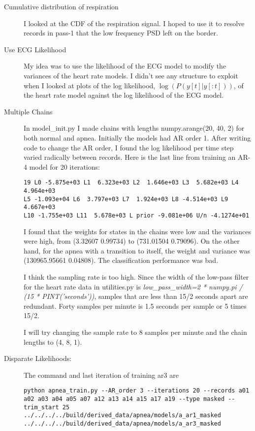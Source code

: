 \documentclass[12pt]{article}
\begin{document}
\begin{description}
\item[Cumulative distribution of respiration] I looked at the CDF of
  the respiration signal.  I hoped to use it to resolve records in
  pass-1 that the low frequency PSD left on the border.
\item[Use ECG Likelihood] My idea was to use the likelihood of the ECG
  model to modify the variances of the heart rate models.  I didn't
  see any structure to exploit when I looked at plots of the log
  likelihood, $\log\left(P(y[t]|y[:t]) \right)$, of the heart rate
  model against the log likelihood of the ECG model.
\item[Multiple Chains] In model\_init.py I made chains with lengths
  numpy.arange(20, 40, 2) for both normal and apnea.  Initially the
  models had AR order 1.  After writing code to change the AR order, I
  found the log likelihood per time step varied radically between
  records.  Here is the last line from training an AR-4 model for 20
  iterations:
\begin{verbatim}
19 L0 -5.875e+03 L1  6.323e+03 L2  1.646e+03 L3  5.682e+03 L4  4.964e+03
L5 -1.093e+04 L6  3.797e+03 L7  1.924e+03 L8 -4.514e+03 L9  4.667e+03
L10 -1.755e+03 L11  5.678e+03 L prior -9.081e+06 U/n -4.1274e+01
\end{verbatim}
  I found that the weights for states in the chains were low and the
  variances were high, from (3.32607 0.99734) to (731.01504 0.79096).
  On the other hand, for the apnea with a transition to itself, the
  weight and variance was (130965.95661 0.04808).  The classification
  performance was bad.

  I think the sampling rate is too high.  Since the width of the
  low-pass filter for the heart rate data in utilities.py is
  \emph{low\_pass\_width=2 * numpy.pi / (15 * PINT('seconds'))},
  samples that are less than 15/2 seconds apart are redundant.  Forty
  samples per minute is 1.5 seconds per sample or 5 times 15/2.

  I will try changing the sample rate to 8 samples per minute and the
  chain lengths to (4, 8, 1).
\item[Disparate Likelihoods:] The command and last iteration of
  training ar3 are
\begin{verbatim}
python apnea_train.py --AR_order 3 --iterations 20 --records a01 a02 a03 a04 a05 a07 a12 a13 a14 a15 a17 a19 --type masked --trim_start 25 ../../../../build/derived_data/apnea/models/a_ar1_masked ../../../../build/derived_data/apnea/models/a_ar3_masked


\end{verbatim}
\end{description}
\end{document}
